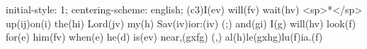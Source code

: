 initial-style: 1;
centering-scheme: english;
(c3)I(ev) will(fv) wait(hv) <sp>*</sp> up(ij)on(i) the(hi) Lord(jv) my(h) Sav(iv)ior:(iv) (;) and(gi) I(g) will(hv) look(f) for(e) him(fv) when(e) he(d) is(ev) near,(gxfg) (,) al(h)le(gxhg)lu(f)ia.(f)
